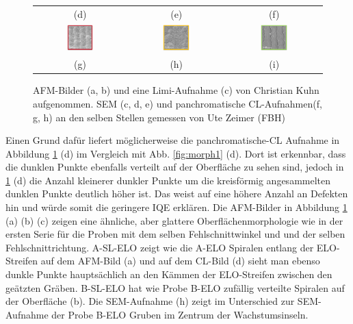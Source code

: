 \begin{figure}[]
\begin{tabular}{ccc}
(d)  & (e) & (f)   \\[6pt]
\includegraphics[width=0.30\textwidth]{Bilder/TS4048/aSLELOcl1.png} & \includegraphics[width=0.30\textwidth]{Bilder/TS4048/bSLELOcl1.png}  & \includegraphics[width=0.30\textwidth]{Bilder/TS4048/cSLELOcl1.png} \\
(g)  & (h) & (i)   \\[6pt]
\end{tabular}
\caption{AFM-Bilder (a, b) und eine Limi-Aufnahme (c) von Christian Kuhn aufgenommen. SEM (c, d, e) und panchromatische CL-Aufnahmen(f, g, h) an den selben Stellen gemessen von Ute Zeimer (FBH)}
\label{fig:morph2}
\end{figure}
\noindent
Einen Grund dafür liefert möglicherweise die panchromatische-CL Aufnahme in Abbildung \ref{fig:morph2} (d) im Vergleich mit Abb. \ref{fig:morph1} (d). Dort ist erkennbar, dass die dunklen Punkte ebenfalls verteilt auf der Oberfläche zu sehen sind, jedoch in \ref{fig:morph2} (d) die Anzahl kleinerer dunkler Punkte um die kreisförmig angesammelten dunklen Punkte deutlich höher ist. Das weist auf eine höhere Anzahl an Defekten hin und würde somit die geringere IQE erklären. Die AFM-Bilder in Abbildung \ref{fig:morph2} (a) (b) (c) zeigen eine ähnliche, aber glattere Oberflächenmorphologie wie in der ersten Serie für die Proben mit dem selben Fehlschnittwinkel und und der selben Fehlschnittrichtung. A-SL-ELO zeigt wie die A-ELO Spiralen entlang der ELO-Streifen auf dem AFM-Bild (a) und auf dem CL-Bild (d) sieht man ebenso dunkle Punkte hauptsächlich an den Kämmen der ELO-Streifen zwischen den geätzten Gräben. B-SL-ELO hat wie Probe B-ELO zufällig verteilte Spiralen auf der Oberfläche (b). Die SEM-Aufnahme (h) zeigt im Unterschied zur SEM-Aufnahme der Probe B-ELO Gruben im Zentrum der Wachstumsinseln. 
